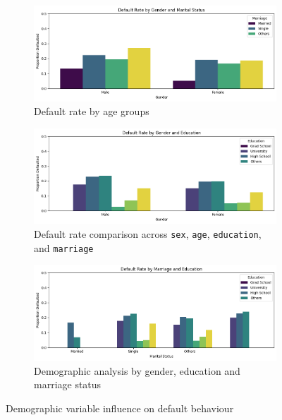 \documentclass[12pt,a4paper]{article}
\begin{document}
\begin{figure}[H]
    \centering
    \begin{subfigure}{0.8\textwidth}
        \centering
        \includegraphics[width=\textwidth]{figures/6a.png}
        \caption{Default rate by age groups}
    \end{subfigure}
    
    \vspace{0.6em}
    \begin{subfigure}{0.8\textwidth}
        \centering
        \includegraphics[width=\textwidth]{figures/6b.png}
        \caption{Default rate comparison across \texttt{sex}, \texttt{age}, \texttt{education}, and \texttt{marriage}}
    \end{subfigure}
    
    \vspace{0.6em}
    \begin{subfigure}{0.8\textwidth}
        \centering
        \includegraphics[width=\textwidth]{figures/6c.png}
        \caption{Demographic analysis by gender, education and marriage status}
    \end{subfigure}
    
    \caption{Demographic variable influence on default behaviour}
    \label{fig:demographic_vertical}
\end{figure}
\end{document}
